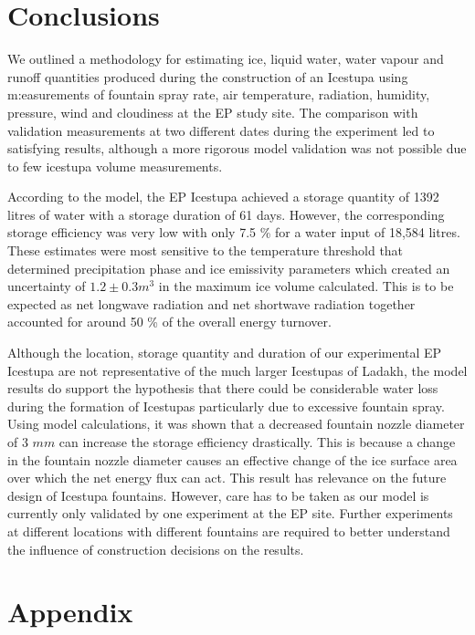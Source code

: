 \documentclass[utf8]{frontiersSCNS} %
\begin{document}
\section{Conclusions} We outlined a methodology for estimating ice, liquid water, water vapour and runoff
quantities produced during the construction of an Icestupa using m:easurements of fountain spray rate, air temperature,
radiation, humidity, pressure, wind and cloudiness at the EP study site. The comparison with validation
measurements at two different dates during the experiment led to satisfying results, although a more rigorous model
validation was not possible due to few icestupa volume measurements.

According to the model, the EP Icestupa achieved a storage quantity of 1392 litres of water with a storage
duration of 61 days. However, the corresponding storage efficiency was very low with only 7.5 \% for a water input of
18,584 litres. These estimates were most sensitive to the temperature threshold that determined precipitation phase
and ice emissivity parameters which created an uncertainty of $1.2 \pm 0.3 m^3$ in the maximum ice volume calculated.
This is to be expected as net longwave radiation and net shortwave radiation together accounted for around 50 \% of
the overall energy turnover.

Although the location, storage quantity and duration of our experimental EP Icestupa are not representative of
the much larger Icestupas of Ladakh, the model results do support the hypothesis that there could be considerable
water loss during the formation of Icestupas particularly due to excessive fountain spray. Using model calculations,
it was shown that a decreased fountain nozzle diameter of 3 $mm$ can increase the storage efficiency drastically. This
is because a change in the fountain nozzle diameter causes an effective change of the ice surface area over which the
net energy flux can act. This result has relevance on the future design of Icestupa fountains. However, care has to be
taken as our model is currently only validated by one experiment at the EP site. Further experiments at
different locations with different fountains are required to better understand the influence of construction decisions
on the results. 



\section{Appendix}
\end{document}
